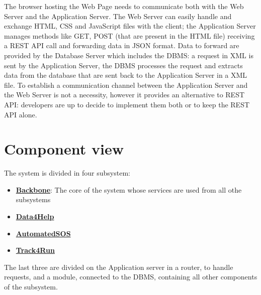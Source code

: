 The browser hosting the Web Page needs to communicate both with the Web Server and the Application Server. 
The Web Server can easily handle and exchange HTML, CSS and JavaScript files with the client; the Application Server manages methods like GET, POST  (that are present in the HTML file) receiving a REST API call and forwarding data in JSON format. Data to forward are provided by the Database Server which includes the DBMS: a request in XML is sent by the Application Server, the DBMS processes the request and extracts data from the database that are sent back to the Application Server in a XML file. To establish a communication channel between the Application Server and the Web Server is not a necessity, however it provides an alternative to REST API: developers are up to decide to implement them both or to keep the REST API alone. 

\section{Component view}
The system is divided in four subsystem:
\begin{itemize}
\item \textbf{\href{subsect:backboneComponentView}{Backbone}}: The core of the system whose services are used from all othe subsystems
\item \textbf{\href{subsect:D4HComponentView}{Data4Help}}
\item \textbf{\href{subsect:ASOSComponentView}{AutomatedSOS}}
\item \textbf{\href{subsect:T4RComponentView}{Track4Run}}
\end{itemize}
The last three are divided on the Application server in a router, to handle requests, and a module, connected to the DBMS, containing all other components of the subsystem. 
